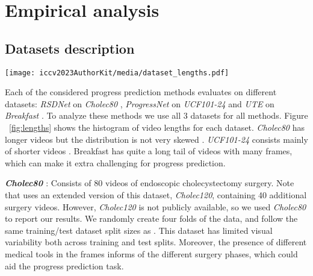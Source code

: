 \section{Empirical analysis}
\label{sec:experiment}

\subsection{Datasets description}

\begin{figure*}[t]  \texttt{[image: iccv2023AuthorKit/media/dataset\_lengths.pdf]}
   \caption{Length distributions for \textsl{UCF101-24}, \textsl{Cholec80}, and \textsl{Breakfast}. \textsl{UCF101-24} are grouped into buckets of size 10, for \textsl{Cholec80} and \textsl{Breakfast} the buckets are of size 100. Most notable is the long tail length distribution on \textsl{Breakfast} which can make progress prediction more difficult.
   }
\label{fig:lengths}
\end{figure*}

Each of the considered progress prediction methods evaluates on different datasets: \textsl{RSDNet} on \textsl{Cholec80} \cite{twinanda2016}, \textsl{ProgressNet} on \textsl{UCF101-24} \cite{soomro2012} and \textsl{UTE} on \textsl{Breakfast} \cite{kuehne2014, kuehne2016}. 
To analyze these methods we use all 3 datasets for all methods. 
Figure ~\ref{fig:lengths} shows the histogram of video lengths for each dataset. 
\textsl{Cholec80} has longer videos but the distribution is not very skewed . 
\textsl{UCF101-24} consists mainly of shorter videos . 
Breakfast has quite a long tail of videos with many frames, which can make it extra challenging for progress prediction.

\smallskip\noindent\textbf{\textsl{Cholec80} \cite{twinanda2016}}: Consists of 80 videos of endoscopic cholecystectomy surgery.  
Note that \cite{twinanda2019} uses an extended version of this dataset, \textsl{Cholec120}, containing 40 additional surgery videos. 
However, \textsl{Cholec120} is not publicly available, so we used \textsl{Cholec80} to report our results. 
We randomly create four folds of the data, and follow the same training\slash test dataset split sizes as \cite{twinanda2019}. 
This dataset has limited visual variability both across training and test splits.
Moreover, the presence of different medical tools in the frames informs of the different surgery phases, which could aid the progress prediction task.

